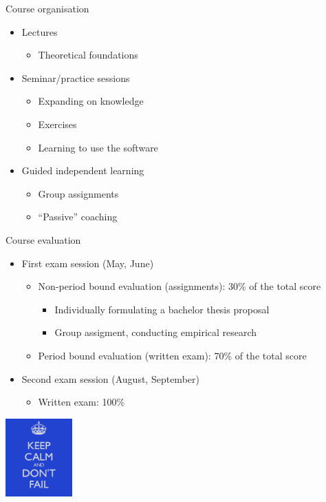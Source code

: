 \documentclass{beamer}
\begin{document}
\begin{frame}{Course organisation}

  \begin{itemize}
    \item Lectures
      \begin{itemize}
        \item Theoretical foundations
      \end{itemize}
    \item Seminar/practice sessions
      \begin{itemize}
        \item Expanding on knowledge
        \item Exercises
        \item Learning to use the software
      \end{itemize}
    \item Guided independent learning
      \begin{itemize}
        \item Group assignments
        \item ``Passive'' coaching
      \end{itemize}
  \end{itemize}
\end{frame}

\begin{frame}{Course evaluation}

  \begin{itemize}
    \item First exam session (May, June)
      \begin{itemize}
        \item Non-period bound evaluation (assignments): 30\% of the total score
          \begin{itemize}
            \item Individually formulating a bachelor thesis proposal
            \item Group assigment, conducting empirical research
          \end{itemize}
        \item Period bound evaluation (written exam): 70\% of the total score
      \end{itemize}
    \item Second exam session (August, September)
      \begin{itemize}
        \item Written exam: 100\%
      \end{itemize}
  \end{itemize}

  \begin{center}
    \includegraphics[height=3cm]{img/intro-07}
  \end{center}
\end{frame}
\end{document}
